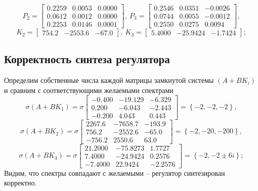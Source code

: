 \documentclass[a4paper, 12pt]{article}
\begin{document}
    $$
    P_2=\begin{bmatrix}
    0.2259    &0.0053    &0.0000\\
    0.0612    &0.0012    &0.0000\\
    0.2253    &0.0146    &0.0001
    \end{bmatrix},\ P_3=\begin{bmatrix}
    0.2546    &0.0351   &-0.0026\\
    0.0744    &0.0055   &-0.0012\\
    0.2550    &0.0275    &0.0094
    \end{bmatrix},
    $$
    $$
    K_2=\begin{bmatrix}
        754.2 &-2553.6 &-67.0
    \end{bmatrix},\ K_3=\begin{bmatrix}
        5.4000  &-25.9424   &-1.7424
    \end{bmatrix};
    $$


    \subsection{Корректность синтеза регулятора}
    Определим собственные числа каждой матрицы замкнутой системы $\left(A+BK_i\right)$ и
    сравним с соответствующими желаемыми спектрами
    $$
    \sigma\left(A+BK_1\right)=\sigma\begin{bmatrix}
    -0.400  &-19.129   &-6.329\\
    0.200   &-6.043   &-2.443\\
   -0.200    &4.043    &0.443
    \end{bmatrix}=\left\{-2,-2,-2\right\},
    $$
    $$
    \sigma\left(A+BK_2\right)=\sigma\begin{bmatrix}
    2267.6   &-7658.7   &-193.9\\
    756.2   &-2552.6   &-65.0\\
   -756.2    &2550.6    &63.0
    \end{bmatrix}=\left\{-2,-20,-200\right\},
    $$
    $$
    \sigma\left(A+BK_3\right)=\sigma\begin{bmatrix}
    21.2000  &-75.8273    &1.7727\\
    7.4000  &-24.9424    &0.2576\\
   -7.4000   &22.9424   &-2.2576
    \end{bmatrix}=\left\{-2,-2\pm6i\right\};
    $$
    Видим, что спектры совпадают с желаемыми -- регулятор синтезирован корректно.

\end{document}
